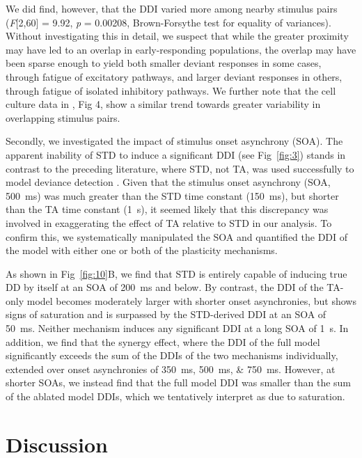 \documentclass[10pt,letterpaper]{article}
\newcommand{\FIG}[1]{Fig~\ref{fig:#1}}
\newcommand{\statistic}[2]{\textit{#1} = \num{#2}}
\begin{document}
We did find, however, that the DDI varied more among nearby stimulus pairs (\textit{F}[2,60] = \num{9.92}, \statistic{p}{0.00208}, Brown-Forsythe test for equality of variances). Without investigating this in detail, we suspect that while the greater proximity may have led to an overlap in early-responding populations, the overlap may have been sparse enough to yield both smaller deviant responses in some cases, through fatigue of excitatory pathways, and larger deviant responses in others, through fatigue of isolated inhibitory pathways. We further note that the cell culture data in \cite{Kubota2021-dx}, Fig 4, show a similar trend towards greater variability in overlapping stimulus pairs.

Secondly, we investigated the impact of stimulus onset asynchrony (SOA). The apparent inability of STD to induce a significant DDI (see \FIG{3}) stands in contrast to the preceding literature, where STD, not TA, was used successfully to model deviance detection \cite{Mill2011-ah, May2015-lt, Yarden2017-eh}. Given that the stimulus onset asynchrony (SOA, \qty{500}{\milli\second}) was much greater than the STD time constant (\qty{150}{\milli\second}), but shorter than the TA time constant (\qty{1}{\second}), it seemed likely that this discrepancy was involved in exaggerating the effect of TA relative to STD in our analysis. To confirm this, we systematically manipulated the SOA and quantified the DDI of the model with either one or both of the plasticity mechanisms.

As shown in \FIG{10}B, we find that STD is entirely capable of inducing true DD by itself at an SOA of \qty{200}{\milli\second} and below. By contrast, the DDI of the TA-only model becomes moderately larger with shorter onset asynchronies, but shows signs of saturation and is surpassed by the STD-derived DDI at an SOA of \qty{50}{\milli\second}. Neither mechanism induces any significant DDI at a long SOA of \qty{1}{\second}. In addition, we find that the synergy effect, where the DDI of the full model significantly exceeds the sum of the DDIs of the two mechanisms individually, extended over onset asynchronies of \qtylist{350;500;750}{\milli\second}. However, at shorter SOAs, we instead find that the full model DDI was smaller than the sum of the ablated model DDIs, which we tentatively interpret as due to saturation.

\section*{Discussion}
\end{document}
